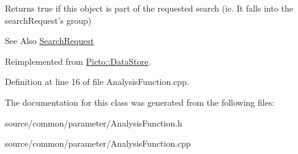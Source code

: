Returns true if this object is part of the requested search (ie. It falls into the search\-Request's group) 

\begin{DoxySeeAlso}{See Also}
\hyperlink{struct_search_request}{Search\-Request} 
\end{DoxySeeAlso}


Reimplemented from \hyperlink{class_picto_1_1_data_store_a5afdea71e71a791fe1abf97b67050907}{Picto\-::\-Data\-Store}.



Definition at line 16 of file Analysis\-Function.\-cpp.



The documentation for this class was generated from the following files\-:\begin{DoxyCompactItemize}
\item 
source/common/parameter/Analysis\-Function.\-h\item 
source/common/parameter/Analysis\-Function.\-cpp\end{DoxyCompactItemize}
